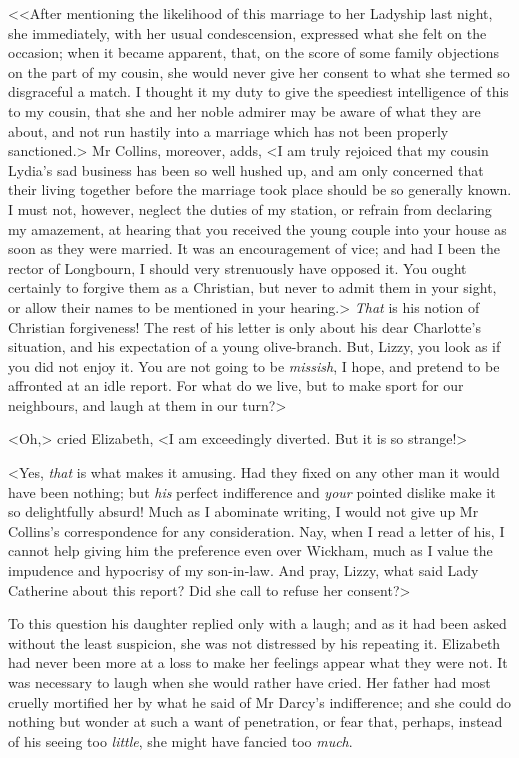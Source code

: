 <<After mentioning the likelihood of this marriage to her Ladyship last night, she immediately, with her usual condescension, expressed what she felt on the occasion; when it became apparent, that, on the score of some family objections on the part of my cousin, she would never give her consent to what she termed so disgraceful a match. I thought it my duty to give the speediest intelligence of this to my cousin, that she and her noble admirer may be aware of what they are about, and not run hastily into a marriage which has not been properly sanctioned.> Mr Collins, moreover, adds, <I am truly rejoiced that my cousin Lydia's sad business has been so well hushed up, and am only concerned that their living together before the marriage took place should be so generally known. I must not, however, neglect the duties of my station, or refrain from declaring my amazement, at hearing that you received the young couple into your house as soon as they were married. It was an encouragement of vice; and had I been the rector of Longbourn, I should very strenuously have opposed it. You ought certainly to forgive them as a Christian, but never to admit them in your sight, or allow their names to be mentioned in your hearing.> \textit{That} is his notion of Christian forgiveness! The rest of his letter is only about his dear Charlotte's situation, and his expectation of a young olive-branch. But, Lizzy, you look as if you did not enjoy it. You are not going to be \textit{missish}, I hope, and pretend to be affronted at an idle report. For what do we live, but to make sport for our neighbours, and laugh at them in our turn?>

<Oh,> cried Elizabeth, <I am exceedingly diverted. But it is so strange!>

<Yes, \textit{that} is what makes it amusing. Had they fixed on any other man it would have been nothing; but \textit{his} perfect indifference and \textit{your} pointed dislike make it so delightfully absurd! Much as I abominate writing, I would not give up Mr Collins's correspondence for any consideration. Nay, when I read a letter of his, I cannot help giving him the preference even over Wickham, much as I value the impudence and hypocrisy of my son-in-law. And pray, Lizzy, what said Lady Catherine about this report? Did she call to refuse her consent?>

To this question his daughter replied only with a laugh; and as it had been asked without the least suspicion, she was not distressed by his repeating it. Elizabeth had never been more at a loss to make her feelings appear what they were not. It was necessary to laugh when she would rather have cried. Her father had most cruelly mortified her by what he said of Mr Darcy's indifference; and she could do nothing but wonder at such a want of penetration, or fear that, perhaps, instead of his seeing too \textit{little}, she might have fancied too \textit{much}.